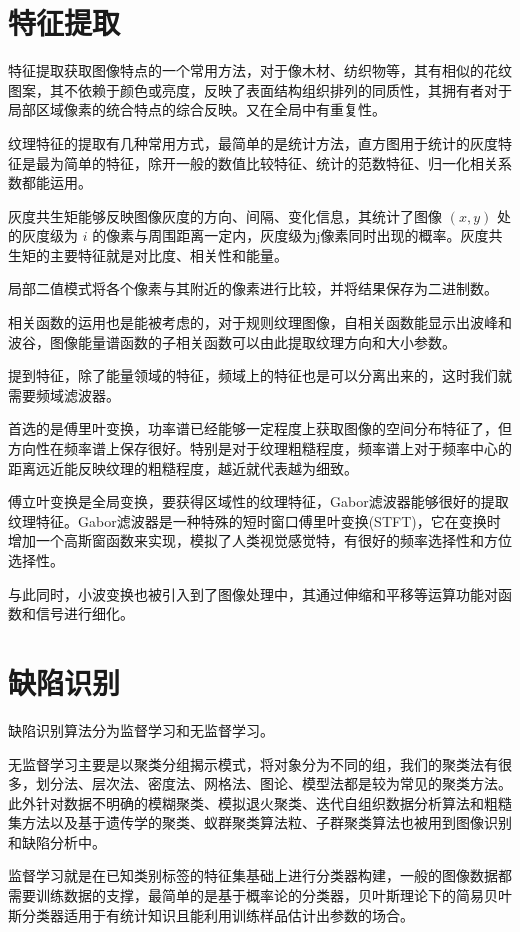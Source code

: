 \section{特征提取}

特征提取获取图像特点的一个常用方法，对于像木材、纺织物等，其有相似的花纹图案，其不依赖于颜色或亮度，反映了表面结构组织排列的同质性，其拥有者对于局部区域像素的统合特点的综合反映。又在全局中有重复性。

纹理特征的提取有几种常用方式，最简单的是统计方法，直方图用于统计的灰度特征是最为简单的特征，除开一般的数值比较特征、统计的范数特征、归一化相关系数都能运用。

灰度共生矩能够反映图像灰度的方向、间隔、变化信息，其统计了图像 $(x,y)$ 处的灰度级为 $i$ 的像素与周围距离一定内，灰度级为j像素同时出现的概率。灰度共生矩的主要特征就是对比度、相关性和能量。

局部二值模式将各个像素与其附近的像素进行比较，并将结果保存为二进制数。

相关函数的运用也是能被考虑的，对于规则纹理图像，自相关函数能显示出波峰和波谷，图像能量谱函数的子相关函数可以由此提取纹理方向和大小参数。

提到特征，除了能量领域的特征，频域上的特征也是可以分离出来的，这时我们就需要频域滤波器。

首选的是傅里叶变换，功率谱已经能够一定程度上获取图像的空间分布特征了，但方向性在频率谱上保存很好。特别是对于纹理粗糙程度，频率谱上对于频率中心的距离远近能反映纹理的粗糙程度，越近就代表越为细致。

傅立叶变换是全局变换，要获得区域性的纹理特征，Gabor滤波器能够很好的提取纹理特征。Gabor滤波器是一种特殊的短时窗口傅里叶变换(STFT)，它在变换时增加一个高斯窗函数来实现，模拟了人类视觉感觉特，有很好的频率选择性和方位选择性。

与此同时，小波变换也被引入到了图像处理中，其通过伸缩和平移等运算功能对函数和信号进行细化。

\section{缺陷识别}

缺陷识别算法分为监督学习和无监督学习。

无监督学习主要是以聚类分组揭示模式，将对象分为不同的组，我们的聚类法有很多，划分法、层次法、密度法、网格法、图论、模型法都是较为常见的聚类方法。此外针对数据不明确的模糊聚类、模拟退火聚类、迭代自组织数据分析算法和粗糙集方法以及基于遗传学的聚类、蚁群聚类算法粒、子群聚类算法也被用到图像识别和缺陷分析中。

监督学习就是在已知类别标签的特征集基础上进行分类器构建，一般的图像数据都需要训练数据的支撑，最简单的是基于概率论的分类器，贝叶斯理论下的简易贝叶斯分类器适用于有统计知识且能利用训练样品估计出参数的场合。

